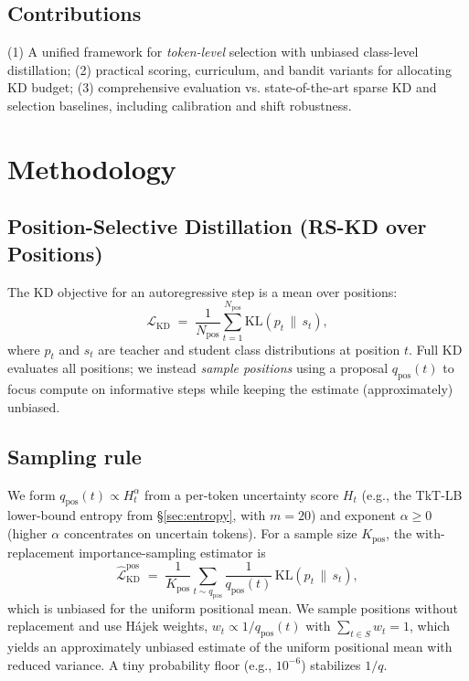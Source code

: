 \documentclass[11pt]{article}
\begin{document}
\subsection{Contributions} (1) A unified framework for \emph{token-level} selection with unbiased class-level distillation; (2) practical scoring, curriculum, and bandit variants for allocating KD budget; (3) comprehensive evaluation vs. state-of-the-art sparse KD and selection baselines, including calibration and shift robustness.


\section{Methodology}

\subsection{Position-Selective Distillation (RS-KD over Positions)}
\label{sec:posrs}

The KD objective for an autoregressive step is a mean over positions:
\[
	\mathcal{L}_{\text{KD}} \;=\; \frac{1}{N_{\text{pos}}} \sum_{t=1}^{N_{\text{pos}}}
	\mathrm{KL}\!\left(p_t \,\|\, s_t\right),
\]
where $p_t$ and $s_t$ are teacher and student class distributions at position $t$.
Full KD evaluates all positions; we instead \emph{sample positions} using a proposal
$q_{\text{pos}}(t)$ to focus compute on informative steps while keeping the estimate (approximately) unbiased.

\subsection{Sampling rule}
We form $q_{\text{pos}}(t) \propto H_t^\alpha$ from a per-token uncertainty score $H_t$
(e.g., the TkT-LB lower-bound entropy from \S\ref{sec:entropy}, with $m{=}20$) and exponent $\alpha\!\ge\!0$ (higher $\alpha$ concentrates on uncertain tokens). For a sample size $K_{\text{pos}}$, the with-replacement importance-sampling estimator is
\[
	\widehat{\mathcal{L}}_{\text{KD}}^{\text{pos}} \;=\;
	\frac{1}{K_{\text{pos}}} \sum_{t \sim q_{\text{pos}}}
	\frac{1}{q_{\text{pos}}(t)} \,\mathrm{KL}\!\left(p_t \,\|\, s_t\right),
\]
which is unbiased for the uniform positional mean. We sample positions without replacement and use Hájek weights, $w_t \propto 1/q_{\text{pos}}(t)$ with $\sum_{t\in S} w_t = 1$, which yields an approximately unbiased estimate of the uniform positional mean with reduced variance.
A tiny probability floor (e.g., $10^{-6}$) stabilizes $1/q$.
\end{document}
